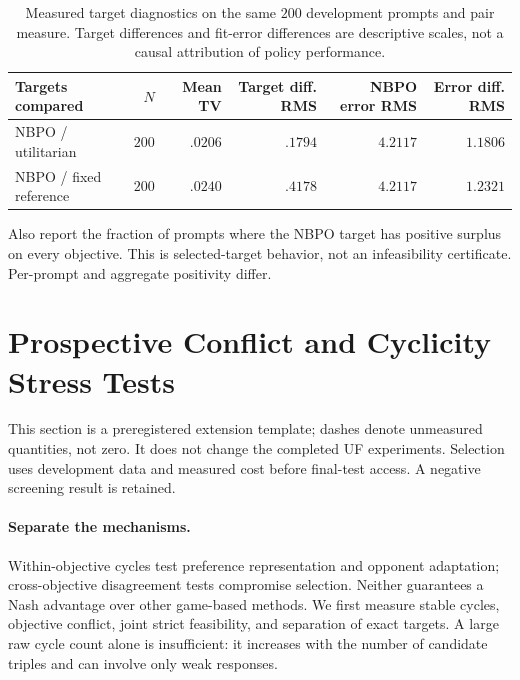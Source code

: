 \documentclass{article}
\theoremstyle{remark}
\theoremstyle{plain}
\begin{document}
\begin{table}[htbp]
\centering\scriptsize
\setlength{\tabcolsep}{5pt}
\caption{Measured target diagnostics on the same $200$ development prompts and pair measure. Target differences and fit-error differences are descriptive scales, not a causal attribution of policy performance.}
\label{tab:target-signal}
\begin{tabular}{lrrrrr}
\toprule
Targets compared & $N$ & Mean TV & Target diff. RMS & NBPO error RMS & Error diff. RMS\\
\midrule
NBPO / utilitarian & $200$ & $.0206$ & $.1794$ & $4.2117$ & $1.1806$\\
NBPO / fixed reference & $200$ & $.0240$ & $.4178$ & $4.2117$ & $1.2321$\\
\bottomrule
\end{tabular}
\end{table}
Also report the fraction of prompts where the NBPO target has positive surplus on every objective. This is selected-target behavior, not an infeasibility certificate. Per-prompt and aggregate positivity differ.


\section{Prospective Conflict and Cyclicity Stress Tests}
\label{app:dataset_stress_test}
This section is a preregistered extension template; dashes denote unmeasured quantities, not zero. It does not change the completed UF experiments. Selection uses development data and measured cost before final-test access. A negative screening result is retained.

\paragraph{Separate the mechanisms.}
Within-objective cycles test preference representation and opponent adaptation; cross-objective disagreement tests compromise selection. Neither guarantees a Nash advantage over other game-based methods. We first measure stable cycles, objective conflict, joint strict feasibility, and separation of exact targets. A large raw cycle count alone is insufficient: it increases with the number of candidate triples and can involve only weak responses.
\end{document}
